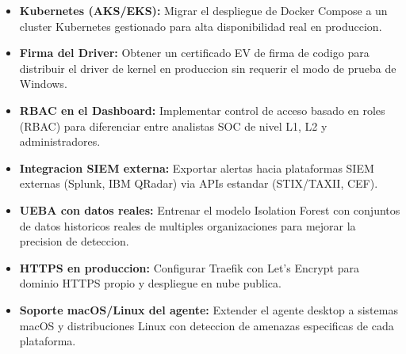 \documentclass[12pt, a4paper]{report}
\begin{document}
\begin{itemize}[leftmargin=2em]
    \item \textbf{Kubernetes (AKS/EKS):} Migrar el despliegue de Docker Compose a un cluster Kubernetes gestionado para alta disponibilidad real en produccion.
    \item \textbf{Firma del Driver:} Obtener un certificado EV de firma de codigo para distribuir el driver de kernel en produccion sin requerir el modo de prueba de Windows.
    \item \textbf{RBAC en el Dashboard:} Implementar control de acceso basado en roles (RBAC) para diferenciar entre analistas SOC de nivel L1, L2 y administradores.
    \item \textbf{Integracion SIEM externa:} Exportar alertas hacia plataformas SIEM externas (Splunk, IBM QRadar) via APIs estandar (STIX/TAXII, CEF).
    \item \textbf{UEBA con datos reales:} Entrenar el modelo Isolation Forest con conjuntos de datos historicos reales de multiples organizaciones para mejorar la precision de deteccion.
    \item \textbf{HTTPS en produccion:} Configurar Traefik con Let's Encrypt para dominio HTTPS propio y despliegue en nube publica.
    \item \textbf{Soporte macOS/Linux del agente:} Extender el agente desktop a sistemas macOS y distribuciones Linux con deteccion de amenazas especificas de cada plataforma.
\end{itemize}

\end{document}
